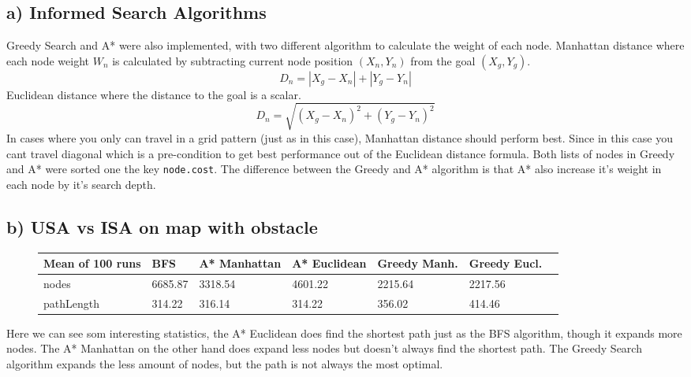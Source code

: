 \documentclass{article}
\begin{document}
\subsection{a) Informed Search Algorithms}
Greedy Search and A* were also implemented, with two different algorithm to calculate the weight of each node.
Manhattan distance where each node weight $W_n$ is calculated by subtracting current node position $(X_n, Y_n)$ from the goal $(X_g, Y_g)$.
\begin{equation}
    D_n = |X_g - X_n| + |Y_g - Y_n|
\end{equation}
Euclidean distance where the distance to the goal is a scalar.
\begin{equation}
   D_n = \sqrt{(X_g - X_n)^2 + (Y_g - Y_n)^2}
\end{equation}
In cases where you only can travel in a grid pattern (just as in this case), Manhattan distance should perform best.
Since in this case you cant travel diagonal which is a pre-condition to get best performance out of the Euclidean distance formula.  
Both lists of nodes in Greedy and A* were sorted one the key \texttt{node.cost}. The difference between the Greedy and A*
algorithm is that A* also increase it's weight in each node by it's search depth.
\subsection{b) USA vs ISA on map with obstacle}
\begin{figure}[H]
    \center
    \begin{tabular}{llllllr}
        \toprule
        {Mean of 100 runs} & {BFS} & {A* Manhattan} & {A* Euclidean} & {Greedy Manh.} & {Greedy Eucl.} \\
        \midrule
        nodes      &  6685.87 &  3318.54 &  4601.22 & 2215.64 & 2217.56 \\
        pathLength &   314.22 &   316.14 &   314.22 & 356.02 & 414.46 \\
        \bottomrule  
    \end{tabular}
\end{figure}
Here we can see som interesting statistics, the A* Euclidean does find the shortest path just as the BFS algorithm, 
though it expands more nodes. The A* Manhattan on the other hand does expand less nodes but doesn't always find the 
shortest path. The Greedy Search algorithm expands the less amount of nodes, but the path is not always the most optimal.
\end{document}
